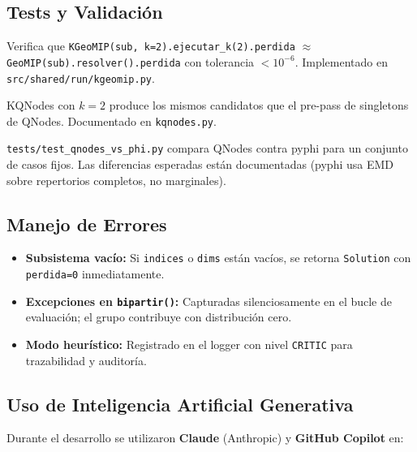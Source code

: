 \subsection{Tests y Validación}

\begin{description}[leftmargin=0pt, style=nextline]
    \item[\textbf{TV-02 (KGeoMIP $k=2 \equiv$ GeoMIP):}]
        Verifica que \texttt{KGeoMIP(sub, k=2).ejecutar\_k(2).perdida} $\approx$ \texttt{GeoMIP(sub).resolver().perdida} con tolerancia $< 10^{-6}$. Implementado en \texttt{src/shared/run/kgeomip.py}.

    \item[\textbf{TV-03 (KQNodes $k=2 \equiv$ QNodes):}]
        KQNodes con $k=2$ produce los mismos candidatos que el pre-pass de singletons de QNodes. Documentado en \texttt{kqnodes.py}.

    \item[\textbf{Tests de integración:}]
        \texttt{tests/test\_qnodes\_vs\_phi.py} compara QNodes contra pyphi para un conjunto de casos fijos. Las diferencias esperadas están documentadas (pyphi usa EMD sobre repertorios completos, no marginales).
\end{description}

\subsection{Manejo de Errores}

\begin{itemize}[itemsep=4pt]
    \item \textbf{Subsistema vacío:} Si \texttt{indices} o \texttt{dims} están vacíos, se retorna \texttt{Solution} con \texttt{perdida=0} inmediatamente.
    \item \textbf{Excepciones en \texttt{bipartir()}:} Capturadas silenciosamente en el bucle de evaluación; el grupo contribuye con distribución cero.
    \item \textbf{Modo heurístico:} Registrado en el logger con nivel \texttt{CRITIC} para trazabilidad y auditoría.
\end{itemize}

\subsection{Uso de Inteligencia Artificial Generativa}

Durante el desarrollo se utilizaron \textbf{Claude} (Anthropic) y \textbf{GitHub Copilot} en:

